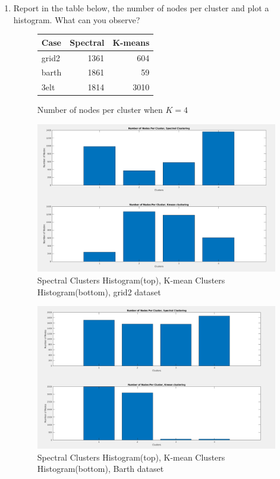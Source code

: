 \documentclass[unicode,11pt,a4paper,oneside,numbers=endperiod,openany]{scrartcl}
\begin{document}
\begin{enumerate}
\item {Report in the table below, the number of nodes per cluster and plot a histogram. What can you observe?} \\


\begin{figure}
\begin{center}
\begin{tabular}{|l|r|r|} \hline
Case & Spectral & K-means \\
\hline
grid2 & 1361 & 604 \\
\hline
barth & 1861 & 59 \\
\hline
3elt & 1814 & 3010 \\
\hline
 
\end{tabular}
\end{center}
\caption{Number of nodes per cluster when ${K=4}$}
\end{figure}


\begin{figure}[h!]
    \begin{minipage}[c]{1\linewidth}
        \centering
        \includegraphics[width=0.4\linewidth]{./figures/grid2Histogram.png}
    \end{minipage}
  \caption{Spectral Clusters Histogram(top), K-mean Clusters Histogram(bottom), grid2 dataset}
\end{figure}

\begin{figure}[h!]
    \begin{minipage}[c]{1\linewidth}
        \centering
        \includegraphics[width=0.4\linewidth]{./figures/barthHistogram.png}
    \end{minipage}
  \caption{Spectral Clusters Histogram(top), K-mean Clusters Histogram(bottom), Barth dataset}
\end{figure}


\end{enumerate}
\end{document}
